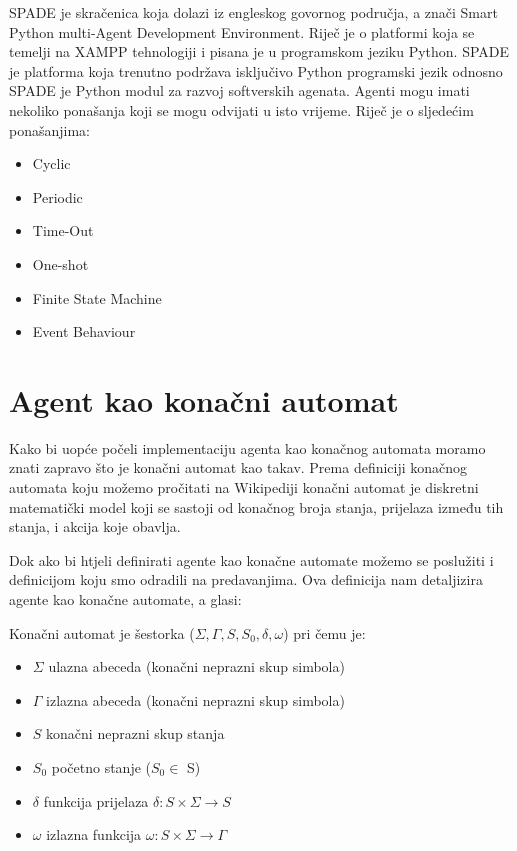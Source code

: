 \documentclass[]{foi} %
\begin{document}
SPADE je skračenica koja dolazi iz engleskog govornog područja, a znači Smart Python multi-Agent Development Environment. Riječ je o platformi koja se temelji na XAMPP tehnologiji i pisana je u programskom jeziku Python. SPADE je platforma koja trenutno podržava isključivo Python programski jezik odnosno SPADE je Python modul za razvoj softverskih agenata. \cite{Spade}
Agenti mogu imati nekoliko ponašanja koji se mogu odvijati u isto vrijeme. Riječ je o sljedećim ponašanjima:

\begin{itemize}
  \item Cyclic
  \item Periodic 
  \item Time-Out
  \item One-shot
  \item Finite State Machine 
  \item Event Behaviour
\end{itemize}

\section{Agent kao konačni automat}
Kako bi uopće počeli implementaciju agenta kao konačnog automata moramo znati zapravo što je konačni automat kao takav. Prema definiciji konačnog automata koju možemo pročitati na Wikipediji konačni automat je diskretni matematički model koji se sastoji od konačnog broja stanja, prijelaza između tih stanja, i akcija koje obavlja. \cite{konacniAutomat} 

Dok ako bi htjeli definirati agente kao konačne automate možemo se poslužiti i definicijom koju smo odradili na predavanjima. Ova definicija nam detaljizira agente kao konačne automate, a glasi:

Konačni automat je šestorka (\(\Sigma, \Gamma, S, S_0, \delta, \omega\)) pri čemu je:
\begin{itemize}
  \item \(\Sigma\) ulazna abeceda (konačni neprazni skup simbola)
  \item \(\Gamma\) izlazna abeceda (konačni neprazni skup simbola)
  \item \(S\) konačni neprazni skup stanja
  \item \(S_0\) početno stanje (\(S_0 \in\) S)
  \item \(\delta\) funkcija prijelaza \( \delta : S \times \Sigma \rightarrow S\)
  \item \(\omega\) izlazna funkcija \( \omega : S \times \Sigma \rightarrow \Gamma\)
\end{itemize}\cite{agentiKonacniAutomati}
\end{document}
